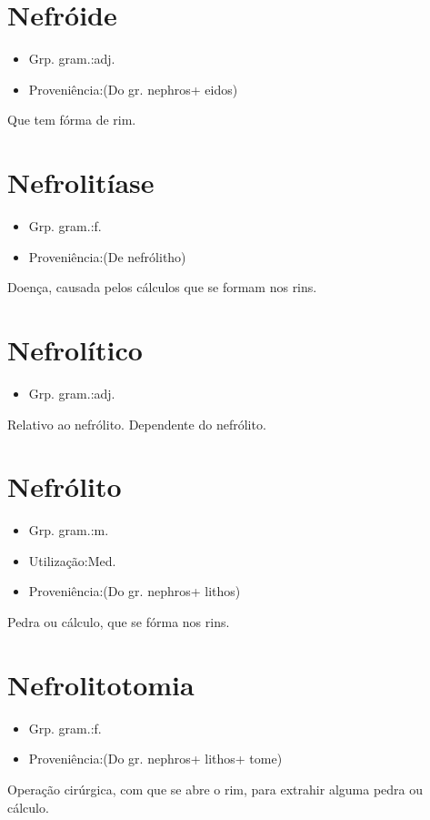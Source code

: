 \section{Nefróide}
\begin{itemize}
\item {Grp. gram.:adj.}
\end{itemize}
\begin{itemize}
\item {Proveniência:(Do gr. \textunderscore nephros\textunderscore  + \textunderscore eidos\textunderscore )}
\end{itemize}
Que tem fórma de rim.
\section{Nefrolitíase}
\begin{itemize}
\item {Grp. gram.:f.}
\end{itemize}
\begin{itemize}
\item {Proveniência:(De \textunderscore nefrólitho\textunderscore )}
\end{itemize}
Doença, causada pelos cálculos que se formam nos rins.
\section{Nefrolítico}
\begin{itemize}
\item {Grp. gram.:adj.}
\end{itemize}
Relativo ao nefrólito.
Dependente do nefrólito.
\section{Nefrólito}
\begin{itemize}
\item {Grp. gram.:m.}
\end{itemize}
\begin{itemize}
\item {Utilização:Med.}
\end{itemize}
\begin{itemize}
\item {Proveniência:(Do gr. \textunderscore nephros\textunderscore  + \textunderscore lithos\textunderscore )}
\end{itemize}
Pedra ou cálculo, que se fórma nos rins.
\section{Nefrolitotomia}
\begin{itemize}
\item {Grp. gram.:f.}
\end{itemize}
\begin{itemize}
\item {Proveniência:(Do gr. \textunderscore nephros\textunderscore  + \textunderscore lithos\textunderscore  + \textunderscore tome\textunderscore )}
\end{itemize}
Operação cirúrgica, com que se abre o rim, para extrahir alguma pedra ou cálculo.
